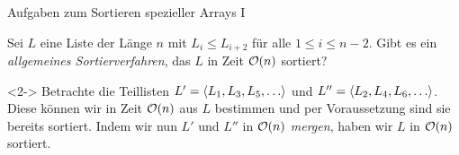



\begin{frame}{Aufgaben zum Sortieren spezieller Arrays I}
\begin{task}
Sei $L$ eine Liste der L\"ange $n$ mit $L_i \leq L_{i + 2}$ f\"ur alle $1 \leq i \leq n - 2$.
Gibt es ein \emph{allgemeines Sortierverfahren}, das $L$ in Zeit $\mathcal{O}(n)$ sortiert?
\end{task}

\begin{solution}<2->
Betrachte die Teillisten $L' = \alglist{L_1, L_3, L_5, \dots}$ und $L'' = \alglist{L_2, L_4, L_6, \dots}$.
Diese k\"onnen wir in Zeit $\mathcal{O}(n)$ aus $L$ bestimmen und per Voraussetzung sind sie bereits sortiert.
Indem wir nun $L'$ und $L''$ in $\mathcal{O}(n)$ \emph{mergen}, haben wir $L$ in $\mathcal{O}(n)$ sortiert.
\end{solution}
\end{frame}

